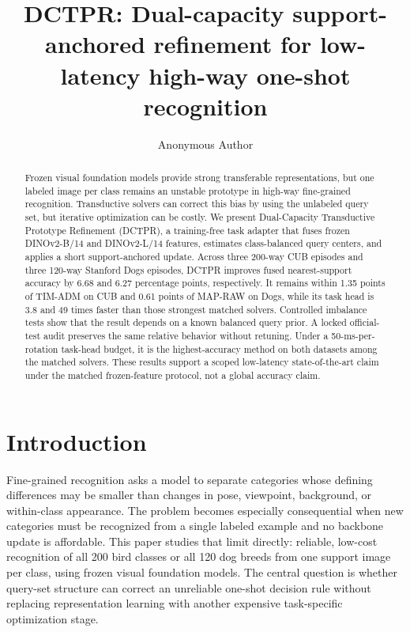 \documentclass[]{spie}
\title{DCTPR: Dual-capacity support-anchored refinement for low-latency high-way one-shot recognition}
\author[a]{Anonymous Author}
\affil[a]{Author names, affiliations, mailing addresses, and e-mail addresses
will be inserted before submission}
\newcommand{\method}{\textsc{DCTPR}\xspace}
\begin{document}
\maketitle

\begin{abstract}
Frozen visual foundation models provide strong transferable representations,
but one labeled image per class remains an unstable prototype in high-way
fine-grained recognition. Transductive solvers can correct this bias by using
the unlabeled query set, but iterative optimization can be costly. We present
Dual-Capacity Transductive Prototype Refinement (\method), a training-free task
adapter that fuses frozen DINOv2-B/14 and DINOv2-L/14 features, estimates
class-balanced query centers, and applies a short support-anchored update.
Across three 200-way CUB episodes and three 120-way Stanford Dogs episodes,
\method improves fused nearest-support accuracy by 6.68 and 6.27 percentage
points, respectively. It remains within 1.35 points of TIM-ADM on CUB and 0.61
points of MAP-RAW on Dogs, while its task head is 3.8 and 49 times faster than
those strongest matched solvers. Controlled imbalance tests show that the
result depends on a known balanced query prior. A locked official-test audit
preserves the same relative behavior without retuning. Under a 50-ms-per-rotation
task-head budget, it is the highest-accuracy method on both datasets among the
matched solvers. These results support a scoped low-latency state-of-the-art
claim under the matched frozen-feature protocol, not a global accuracy claim.
\end{abstract}


\section{Introduction}
\label{sec:introduction}

Fine-grained recognition asks a model to separate categories whose defining
differences may be smaller than changes in pose, viewpoint, background, or
within-class appearance. The problem becomes especially consequential when new
categories must be recognized from a single labeled example and no backbone
update is affordable. This paper studies that limit directly: reliable,
low-cost recognition of all 200 bird classes or all 120 dog breeds from one
support image per class, using frozen visual foundation models. The central
question is whether query-set structure can correct an unreliable one-shot
decision rule without replacing representation learning with another expensive
task-specific optimization stage.
\end{document}
